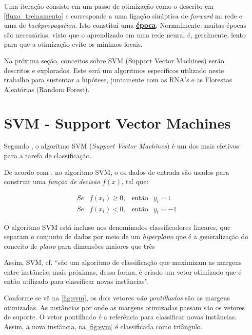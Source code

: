 Uma iteração consiste em um passo de otimização como o descrito em \ref{fluxo_treinamento} e corresponde a uma ligação sináptica de \textit{forward} na rede e uma de \textit{backpropagation}. Isto constitui uma \textbf{\underline{época}}. Normalmente, muitas épocas são necessárias, visto que o aprendizado em uma rede neural é, geralmente, lento para que a otimização evite os mínimos locais.

Na próxima seção, conceitos sobre SVM (Support Vector Machines) serão descritos e explorados. Este será um algoritmos específicos utilizado neste trabalho para sustentar a hipótese, juntamente com as RNA's e as Florestas Aleatórias (Random Forest).

\section{SVM - Support Vector Machines}\label{SVM}
Segundo , o algoritmo SVM (\textit{Support Vector Machines}) é um dos mais efetivos para a tarefa de classificação.

De acordo com , no algoritmo SVM, o os dados de entrada são usados para construir uma \textit{função de decisão} $f(x)$, tal que:	

\begin{equation}
	\begin{matrix}
		Se & f(x_i) \ge 0, &\textrm{então}&  y_i = 1   \\
		Se & f(x_i) < 0,   &\textrm{então}&  y_i = -1   
	\end{matrix}
\end{equation}

O algoritmo SVM está incluso nos denominados classificadores lineares, que separam o conjunto de dados por meio de um \textit{hiperplano} que é a generalização do conceito de \textit{plano} para dimensões maiores que três 

Assim, SVM, cf.  ``são um algoritmo de classificação que maximizam as margens entre instâncias mais próximas, dessa forma, é criado um vetor otimizado que é então utilizado para classificar novas instâncias''.

Conforme se vê na \autoref{fig:svm}, os dois vetores \textit{não pontilhados} são as margens otimizadas. As instâncias por onde as margens otimizadas passam são os vetores de suporte. O vetor pontilhado é a referência para classificar novas instâncias. Assim, a nova instância, na \autoref{fig:svm} é classificada como triângulo.

